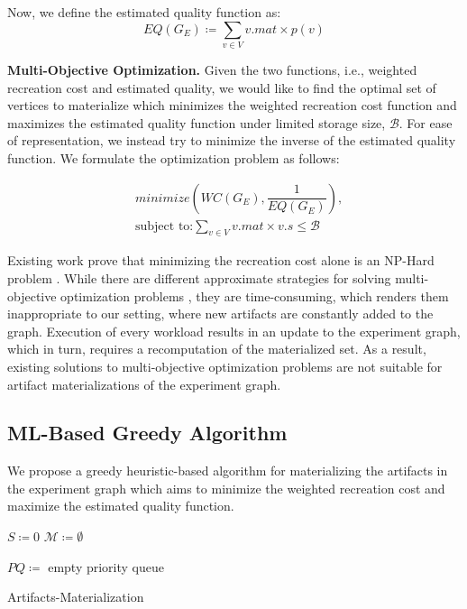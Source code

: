 Now, we define the estimated quality function as:
\[
EQ(G_E) \coloneqq  \sum\limits_{v \in V}  v.mat \times p(v)
\]

\textbf{Multi-Objective Optimization.}
Given the two functions, i.e., weighted recreation cost and estimated quality, we would like to find the optimal set of vertices to materialize which minimizes the weighted recreation cost function and maximizes the estimated quality function under limited storage size, $\mathcal{B}$.
For ease of representation, we instead try to minimize the inverse of the estimated quality function.
We formulate the optimization problem as follows:

\begin{equation}\label{multi-obj-opt}
\begin{split}
& minimize(WC(G_E), \dfrac{1}{EQ(G_E)}), \\
& \text{subject to:} \sum\limits_{v \in V} v.mat \times v.s \leq \mathcal{B}
\end{split}
\end{equation}

Existing work prove that minimizing the recreation cost alone is an NP-Hard problem \cite{bhattacherjee2015principles}.
While there are different approximate strategies for solving multi-objective optimization problems \cite{coello2007evolutionary}, they are time-consuming, which renders them inappropriate to our setting, where new artifacts are constantly added to the graph.
Execution of every workload results in an update to the experiment graph, which in turn, requires a recomputation of the materialized set.
As a result, existing solutions to multi-objective optimization problems are not suitable for artifact materializations of the experiment graph.

\subsection{ML-Based Greedy Algorithm}\label{subsec-ml-based-materialization}
We propose a greedy heuristic-based algorithm for materializing the artifacts in the experiment graph which aims to minimize the weighted recreation cost and maximize the estimated quality function.

\begin{algorithm}[h]
$S \coloneqq 0$
$\mathcal{M} \coloneqq \emptyset$

$PQ \coloneqq $ empty priority queue\;

\caption{Artifacts-Materialization}\label{algorithm-materialization}
\end{algorithm}

